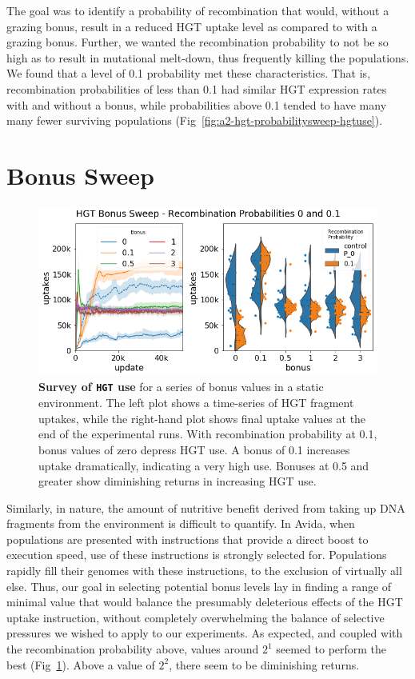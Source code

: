 \documentclass[PhD]{msu-thesis}
\begin{document}
\begin{appendices}
The goal was to identify a probability of recombination that would, without a grazing bonus, result in a reduced HGT uptake level as compared to with a grazing bonus. Further, we wanted the recombination probability to not be so high as to result in mutational melt-down, thus frequently killing the populations. We found that a level of 0.1 probability met these characteristics. That is, recombination probabilities of less than 0.1 had similar HGT expression rates with and without a bonus, while probabilities above 0.1 tended to have many many fewer surviving populations (Fig~\ref{fig:a2-hgt-probabilitysweep-hgtuse}).




\section{Bonus Sweep}
	\begin{figure}[!h]
	\includegraphics[trim={0 0 0 0}, clip, width=0.85\columnwidth]{figures/A2/a2-hgt-bonussweep-hgtuse.png}
	\caption{\textbf{Survey of \texttt{HGT} use} for a series of bonus values in a static environment. The left plot shows a time-series of HGT fragment uptakes, while the right-hand plot shows final uptake values at the end of the experimental runs. With recombination probability at 0.1, bonus values of zero depress HGT use. A bonus of 0.1 increases uptake dramatically, indicating a very high use. Bonuses at 0.5 and greater show diminishing returns in increasing HGT use.%
	}
	\label{fig:a2-hgt-bonussweep-hgtuse}
	\end{figure}
Similarly, in nature, the amount of nutritive benefit derived from taking up DNA fragments from the environment is difficult to quantify. In Avida, when populations are presented with instructions that provide a direct boost to execution speed, use of these instructions is strongly selected for. Populations rapidly fill their genomes with these instructions, to the exclusion of virtually all else. Thus, our goal in selecting potential bonus levels lay in finding a range of minimal value that would balance the presumably deleterious effects of the HGT uptake instruction, without completely overwhelming the balance of selective pressures we wished to apply to our experiments. As expected, and coupled with the recombination probability above, values around $2^1$ seemed to perform the best (Fig~\ref{fig:a2-hgt-bonussweep-hgtuse}). Above a value of $2^2$, there seem to be diminishing returns.





\end{appendices}
\end{document}
